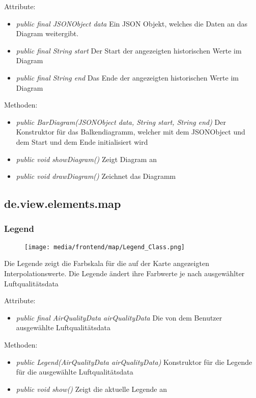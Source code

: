 Attribute:
\begin{itemize} 
    \item \emph{public final JSONObject data} Ein JSON Objekt, welches die Daten an das Diagram weitergibt.
    \item \emph{public final String start} Der Start der angezeigten historischen Werte im Diagram
    \item \emph{public final String end} Das Ende der angezeigten historischen Werte im Diagram
\end{itemize}   
Methoden:
\begin{itemize}      
    \item \emph{public BarDiagram(JSONObject data, String start, String end)} Der Konstruktor für das Balkendiagramm, welcher mit dem JSONObject und dem Start und dem Ende initialisiert wird
    \item \emph{public void showDiagram()} Zeigt Diagram an
    \item \emph{public void drawDiagram()} Zeichnet das Diagramm
\end{itemize}

\subsection{de.view.elements.map}

\subsubsection{Legend}
\begin{minipage}{0.3\textwidth}
    \begin{figure}[H]
        \texttt{[image: media/frontend/map/Legend\_Class.png]}
    \end{figure}
    \end{minipage} \hfill
    \begin{minipage}{0.6\textwidth}
Die Legende zeigt die Farbskala für die auf der Karte angezeigten Interpolationswerte. Die Legende ändert ihre Farbwerte je nach ausgewählter Luftqualitätsdata
\end{minipage}

Attribute:
\begin{itemize} 
    \item \emph{public final AirQualityData airQualityData} Die von dem Benutzer ausgewählte Luftqualitätsdata
\end{itemize} 
Methoden:
\begin{itemize}     
    \item \emph{public Legend(AirQualityData airQualityData)} Konstruktor für die Legende für die ausgewählte Luftqualitätsdata
    \item \emph{public void show()} Zeigt die aktuelle Legende an
\end{itemize}

